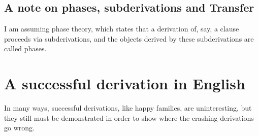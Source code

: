 \documentclass[MilwayThesis]{subfiles}
\begin{document}
\subsection{A note on phases, subderivations and Transfer}
I am assuming phase theory, which states that a derivation of, say, a clause proceeds via subderivations, and the objects derived by these subderivations are called phases.

\section{A successful derivation in English}\label{sec:EngDeriv}
In many ways, successful derivations, like happy families, are uninteresting, but they still must be demonstrated in order to show where the crashing derivations go wrong.
\end{document}
